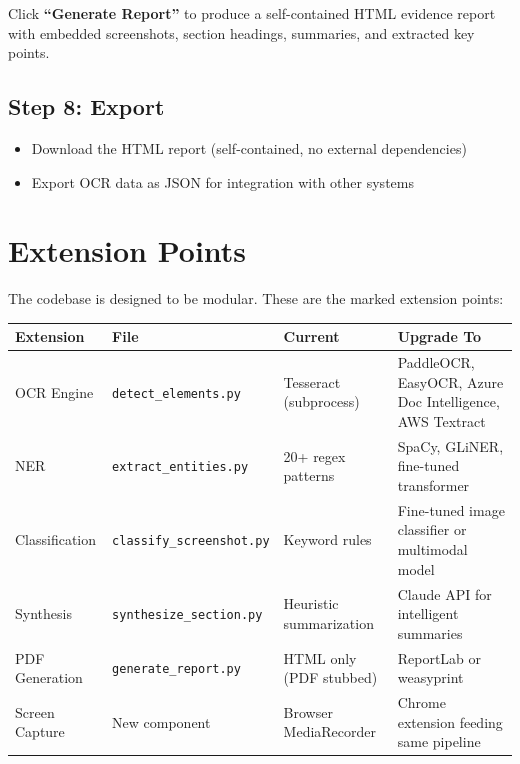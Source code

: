 \documentclass[12pt, a4paper]{article}
\newcommand{\filepath}[1]{\texttt{\small #1}}
\begin{document}
Click \textbf{``Generate Report''} to produce a self-contained HTML evidence report with embedded screenshots, section headings, summaries, and extracted key points.

\subsection{Step 8: Export}

\begin{itemize}
    \item Download the HTML report (self-contained, no external dependencies)
    \item Export OCR data as JSON for integration with other systems
\end{itemize}

\section{Extension Points}

The codebase is designed to be modular. These are the marked extension points:

\begin{longtable}{@{} p{3.5cm} p{3.5cm} p{3.5cm} p{3.5cm} @{}}
    \toprule
    \textbf{Extension} & \textbf{File} & \textbf{Current} & \textbf{Upgrade To} \\
    \midrule
    \endhead
    OCR Engine & \filepath{detect\_elements.py} & Tesseract (subprocess) & PaddleOCR, EasyOCR, Azure Doc Intelligence, AWS Textract \\[6pt]
    NER & \filepath{extract\_entities.py} & 20+ regex patterns & SpaCy, GLiNER, fine-tuned transformer \\[6pt]
    Classification & \filepath{classify\_screenshot.py} & Keyword rules & Fine-tuned image classifier or multimodal model \\[6pt]
    Synthesis & \filepath{synthesize\_section.py} & Heuristic summarization & Claude API for intelligent summaries \\[6pt]
    PDF Generation & \filepath{generate\_report.py} & HTML only (PDF stubbed) & ReportLab or weasyprint \\[6pt]
    Screen Capture & New component & Browser MediaRecorder & Chrome extension feeding same pipeline \\
    \bottomrule
\end{longtable}
\end{document}

